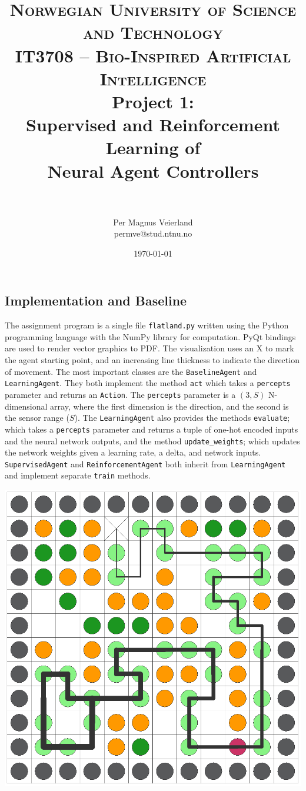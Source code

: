\documentclass[paper=a4, fontsize=10pt]{scrartcl}
\title{
\vspace{-1cm}
\normalfont \normalsize
\textsc{Norwegian University of Science and Technology\\IT3708 -- Bio-Inspired Artificial Intelligence}
\horrule{0.5pt} \\[0cm]
\huge Project 1:\\ Supervised and Reinforcement Learning of\\Neural Agent Controllers\\[-0.3cm]
\horrule{2pt} \\[0.1cm]
}
\author{Per Magnus Veierland\\permve@stud.ntnu.no}
\date{\normalsize\today}
\begin{document}
\maketitle

\begin{multicols}{2}

\section*{Implementation and Baseline}

The assignment program is a single file \texttt{flatland.py} written using the Python programming language with the NumPy library for computation. PyQt bindings are used to render vector graphics to PDF. The visualization uses an \textsc{X} to mark the agent starting point, and an increasing line thickness to indicate the direction of movement. The most important classes are the \texttt{BaselineAgent} and \texttt{LearningAgent}. They both implement the method \texttt{act} which takes a \texttt{percepts} parameter and returns an \texttt{Action}. The \texttt{percepts} parameter is a $(3,S)$ N-dimensional array, where the first dimension is the direction, and the second is the sensor range ($S$). The \texttt{LearningAgent} also provides the methods \texttt{evaluate}; which takes a \texttt{percepts} parameter and returns a tuple of one-hot encoded inputs and the neural network outputs, and the method \texttt{update\_weights}; which updates the network weights given a learning rate, a delta, and network inputs. \texttt{SupervisedAgent} and \texttt{ReinforcementAgent} both inherit from \texttt{LearningAgent} and implement separate \texttt{train} methods.

{
\vspace{0.3cm}
\centering
\includegraphics[scale=0.2]{../data/render-baseline.pdf}
\label{figure:flatland_baseline}
\vspace{0.3cm}
}


\end{multicols}
\end{document}

